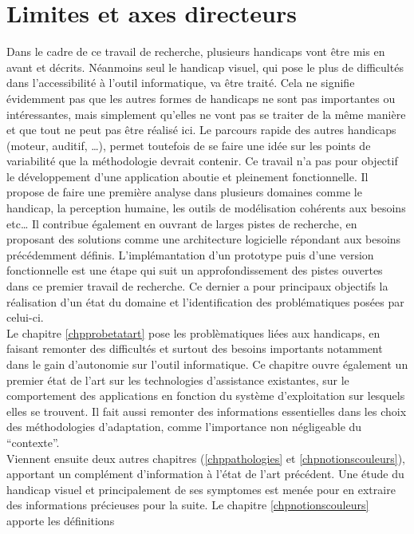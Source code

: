 \documentclass[french,a4paper]{report}
\begin{document}
\section{Limites et axes directeurs}
Dans le cadre de ce travail de recherche, plusieurs handicaps vont être mis en avant
et décrits. Néanmoins seul le handicap visuel, qui pose le plus de difficultés dans l'accessibilité
à l'outil informatique, va être traité. Cela ne signifie évidemment pas que les autres formes
de handicaps ne sont pas importantes ou intéressantes, mais simplement qu'elles ne vont pas se
traiter de la même manière et que tout ne peut pas être réalisé ici.
Le parcours rapide des autres handicaps (moteur, auditif, \dots), permet toutefois de se faire
une idée sur les points de variabilité que la méthodologie devrait contenir.
\newline
Ce travail n'a pas pour objectif le développement d'une application aboutie et pleinement
fonctionnelle. Il propose de faire une première analyse dans plusieurs domaines comme le
handicap, la perception humaine, les outils de modélisation cohérents aux besoins etc\dots
Il contribue également en ouvrant de larges pistes de recherche, en proposant des
solutions comme une architecture logicielle répondant aux besoins précédemment définis.
L'implémantation d'un prototype puis d'une version fonctionnelle est une étape qui suit
un approfondissement des pistes ouvertes dans ce premier travail de recherche.
Ce dernier a pour principaux objectifs la réalisation d'un état du domaine et
l'identification des problématiques posées par celui-ci.\\
Le chapitre \ref{chpprobetatart} pose les problèmatiques liées aux handicaps, en faisant
remonter des difficultés et surtout des besoins importants notamment dans le gain
d'autonomie sur l'outil informatique. Ce chapitre ouvre également un premier état de l'art
sur les technologies d'assistance existantes, sur le comportement des applications en
fonction du système d'exploitation sur lesquels elles se trouvent. Il fait aussi
remonter des informations essentielles dans les choix des méthodologies d'adaptation,
comme l'importance non négligeable du \enquote{contexte}.\\
Viennent ensuite deux autres chapitres (\ref{chppathologies} et \ref{chpnotionscouleurs}),
apportant un complément d'information à l'état de l'art précédent. Une étude du handicap
visuel et principalement de ses \glspl{symptome} est menée pour en extraire des informations
précieuses pour la suite. Le chapitre \ref{chpnotionscouleurs} apporte les définitions
\end{document}
